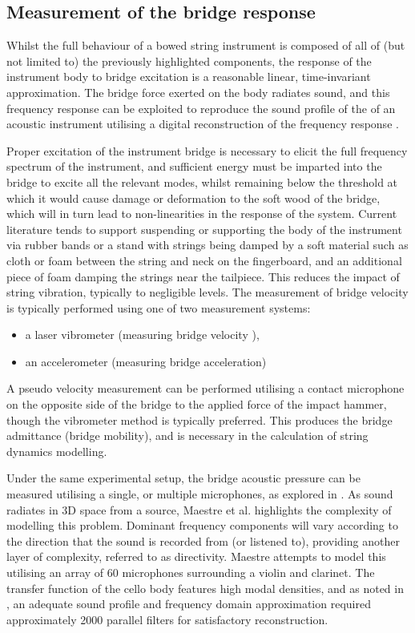 \subsection{Measurement of the bridge response}
\label{sec:measurement}
Whilst the full behaviour of a bowed string instrument is composed of all of (but not limited to) the previously highlighted components, the response of the instrument body to bridge excitation is a reasonable linear, time-invariant approximation. The bridge force exerted on the body radiates sound, and this frequency response can be exploited to reproduce the sound profile of the of an acoustic instrument utilising a digital reconstruction of the frequency response \cite{karjalainen2008}.

Proper excitation of the instrument bridge is necessary to elicit the full frequency spectrum of the instrument, and sufficient energy must be imparted into the bridge to excite all the relevant modes, whilst remaining below the threshold at which it would cause damage or deformation to the soft wood of the bridge, which will in turn lead to non-linearities in the response of the system. Current literature tends to support suspending or supporting the body of the instrument via rubber bands or a stand \cite{maestre2013} with strings being damped by a soft material such as cloth or foam between the string and neck on the fingerboard, and an additional piece of foam damping the strings near the tailpiece. This reduces the impact of string vibration, typically to negligible levels.
The measurement of bridge velocity is typically performed using one of two measurement systems:
\begin{itemize}
    \item a laser vibrometer (measuring bridge velocity \cite{maestre2013}),
    \item an accelerometer (measuring bridge acceleration) \cite{woodhouse2014}
\end{itemize}
A pseudo velocity measurement can be performed utilising a contact microphone on the opposite side of the bridge to the applied force of the impact hammer, though the vibrometer method is typically preferred. This produces the bridge admittance (bridge mobility), and is necessary in the calculation of string dynamics modelling\cite{maestre2013}.

Under the same experimental setup, the bridge acoustic pressure can be measured utilising a single, or multiple microphones, as explored in \cite{maestre2019}. As sound radiates in 3D space from a source, Maestre et al. highlights the complexity of modelling this problem. Dominant frequency components will vary according to the direction that the sound is recorded from (or listened to), providing another layer of complexity, referred to as directivity. Maestre attempts to model this utilising an array of 60 microphones surrounding a violin and clarinet. The transfer function of the cello body features high modal densities, and as noted in \cite{oneill}, an adequate sound profile and frequency domain approximation required approximately 2000 parallel filters for satisfactory reconstruction.

